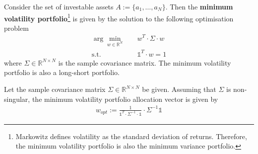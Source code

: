     \begin{definition}\label{definition:MinimumVolatilityPortfolio}
        Consider the set of investable assets $A := \{ a_1, \dots, a_N \}$. Then the \textbf{minimum volatility portfolio}\footnote{Markowitz defines volatility as the standard deviation of returns. Therefore, the minimum volatility portfolio is also the minimum variance portfolio.} is given by the solution to the following optimisation problem
        \begin{align*}
            \arg \min_{w \in \mathbb{R}^N}& \quad w^T \cdot \Sigma \cdot w \\
            \text{s.t.}& \quad \mathds{1}^T \cdot w = 1
        \end{align*}
		where $\Sigma \in \mathbb{R}^{N \times N}$ is the sample covariance matrix. The minimum volatility portfolio is also a long-short portfolio.
    \end{definition}
    
    
    \begin{theorem}
        Let the sample covariance matrix $\Sigma \in \mathbb{R}^{N \times N}$ be given. Assuming that $\Sigma$ is non-singular, the minimum volatility portfolio allocation vector is given by
        \begin{align*}
            w_{opt} := \frac{1}{\mathds{1}^T \cdot \Sigma^{-1} \cdot \mathds{1}} \cdot \Sigma^{-1} \mathds{1}
        \end{align*}
    \end{theorem}
    
